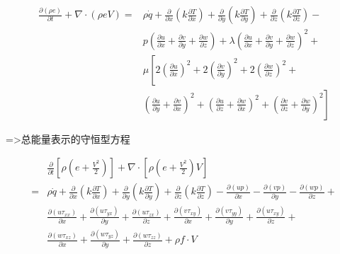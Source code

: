 $$
	\begin{aligned}
		\frac{\partial(\rho e)}{\partial t}+\nabla \cdot(\rho e V)= & \rho \dot{q}+\frac{\partial}{\partial x}\left(k \frac{\partial T}{\partial x}\right)+\frac{\partial}{\partial y}\left(k \frac{\partial T}{\partial y}\right)+\frac{\partial}{\partial z}\left(k \frac{\partial T}{\partial z}\right)-               \\
		                                                            & p\left(\frac{\partial u}{\partial x}+\frac{\partial v}{\partial y}+\frac{\partial w}{\partial z}\right)+\lambda\left(\frac{\partial u}{\partial x}+\frac{\partial v}{\partial y}+\frac{\partial w}{\partial z}\right)^{2}+                          \\
		                                                            & \mu\left[2\left(\frac{\partial u}{\partial x}\right)^{2}+2\left(\frac{\partial v}{\partial y}\right)^{2}+2\left(\frac{\partial w}{\partial z}\right)^{2}+\right.                                                                                    \\
		                                                            & \left.\left(\frac{\partial u}{\partial y}+\frac{\partial v}{\partial x}\right)^{2}+\left(\frac{\partial u}{\partial z}+\frac{\partial w}{\partial x}\right)^{2}+\left(\frac{\partial v}{\partial z}+\frac{\partial w}{\partial y}\right)^{2}\right]
	\end{aligned}
$$


=>总能量表示的守恒型方程

$$
	\begin{aligned}
		  & \frac{\partial}{\partial t}\left[\rho\left(e+\frac{V^{2}}{2}\right)\right]+\nabla \cdot\left[\rho\left(e+\frac{V^{2}}{2}\right) V\right]                                                                                                                                                                                                 \\
		= & \rho \dot{q}+\frac{\partial}{\partial x}\left(k \frac{\partial T}{\partial x}\right)+\frac{\partial}{\partial y}\left(k \frac{\partial T}{\partial y}\right)+\frac{\partial}{\partial z}\left(k \frac{\partial T}{\partial z}\right)-\frac{\partial(u p)}{\partial x}-\frac{\partial(v p)}{\partial y}-\frac{\partial(w p)}{\partial z}+ \\
		  & \frac{\partial\left(u \tau_{x x}\right)}{\partial x}+\frac{\partial\left(u \tau_{y x}\right)}{\partial y}+\frac{\partial\left(u \tau_{z x}\right)}{\partial z}+\frac{\partial\left(v \tau_{x y}\right)}{\partial x}+\frac{\partial\left(v \tau_{y y}\right)}{\partial y}+\frac{\partial\left(u \tau_{x y}\right)}{\partial z}+           \\
		  & \frac{\partial\left(w \tau_{x z}\right)}{\partial x}+\frac{\partial\left(w \tau_{y z}\right)}{\partial y}+\frac{\partial\left(w \tau_{z z}\right)}{\partial z}+\rho f \cdot V
	\end{aligned}
$$

